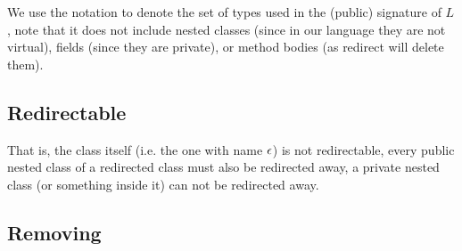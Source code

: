 \begin{defs}
%	
	
\end{defs}

We use the notation  to denote the set of types used in the (public) signature of $L$, note that it does not include nested classes (since in our language they are not virtual),  fields (since they are private), or method bodies (as redirect will delete them).

\subsection{Redirectable}
\begin{defs}
\end{defs}
That is, the class itself (i.e. the one with name $\epsilon$) is not redirectable, every public nested class of a redirected class must also be redirected away, a private nested class (or something inside it) can not be redirected away.


\subsection{Removing}

